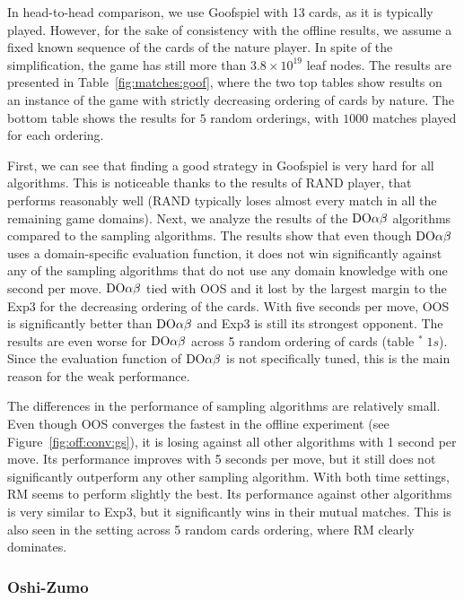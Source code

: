 In head-to-head comparison, we use Goofspiel with 13 cards, as it is typically played. However, for the sake of consistency with the offline results, we assume a fixed known sequence of the cards of the nature player. In spite of the simplification, the game has still more than $3.8\times 10^{19}$ leaf nodes. The results are presented in Table~\ref{fig:matches:goof}, where the two top tables show results on an instance of the game with strictly decreasing ordering of cards by nature. The bottom table shows the results for $5$ random orderings, with $1000$ matches played for each ordering.

First, we can see that finding a good strategy in Goofspiel is very hard for all algorithms.
This is noticeable thanks to the results of RAND player, that performs reasonably well (RAND typically loses almost every match in all the remaining game domains). 
Next, we analyze the results of the $\textrm{DO}\alpha\beta$ algorithms compared to the sampling algorithms.
The results show that even though $\textrm{DO}\alpha\beta$ uses a domain-specific evaluation function, it does not win significantly against any of the sampling algorithms that do not use any domain knowledge with one second per move. $\textrm{DO}\alpha\beta$ tied with OOS and it lost by the largest margin to the Exp3 for the decreasing ordering of the cards. With five seconds per move, OOS is significantly better than $\textrm{DO}\alpha\beta$ and Exp3 is still its strongest opponent. The results are even worse for $\textrm{DO}\alpha\beta$ across 5 random ordering of cards (table $^*\;1s$). Since the evaluation function of $\textrm{DO}\alpha\beta$ is not specifically tuned, this is the main reason for the weak performance. 

The differences in the performance of sampling algorithms are relatively small. Even though OOS converges the fastest in the offline experiment (see Figure~\ref{fig:off:conv:gs}), it is losing against all other algorithms with 1 second per move. Its performance improves with 5 seconds per move, but it still does not significantly outperform any other sampling algorithm. With both time settings, RM seems to perform slightly the best. Its performance against other algorithms is very similar to Exp3, but it significantly wins in their mutual matches.
This is also seen in the setting across 5 random cards ordering, where RM clearly dominates.

\subsubsection{Oshi-Zumo}

